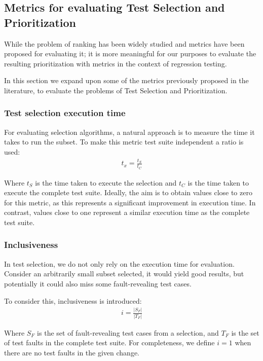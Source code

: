 \subsection{Metrics for evaluating Test Selection and Prioritization}
\label{sec:bg-metrics-tsp}

While the problem of ranking has been widely studied and metrics have been proposed for evaluating it; it is more
meaningful for our purposes to evaluate the resulting prioritization with metrics in the context of regression testing.

In this section we expand upon some of the metrics previously proposed in the literature, to evaluate the problems of Test Selection
and Prioritization.

\subsubsection{Test selection execution time}
For evaluating selection algorithms, a natural approach is to measure the time it takes to run the subset. To make 
this metric test suite independent a ratio is used:
\begin{align*}
    t_x = \frac{t_S}{t_C}
\end{align*}

Where $t_S$ is the time taken to execute the selection and $t_C$ is the time taken to execute the complete test suite.
Ideally, the aim is to obtain values close to zero for this metric, as this represents a significant improvement
in execution time. In contrast, values close to one represent a similar execution time as the complete test suite.

\subsubsection{Inclusiveness}
In test selection, we do not only rely on the execution time for evaluation. Consider an arbitrarily small subset selected, it would yield good results,
but potentially it could also miss some fault-revealing test cases.

To consider this, inclusiveness is introduced:
\begin{align*}
i = \frac{|S_F|}{|T_F|}
\end{align*}

Where $S_F$ is the set of fault-revealing test cases from a selection, and $T_F$ is the set of test faults in the complete
test suite. For completeness, we define $i=1$ when there are no test faults in the given change.

